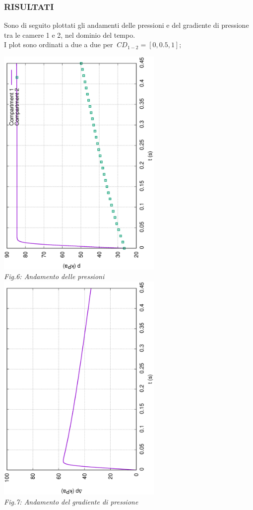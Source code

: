 \documentclass{article}
\begin{document}
        \subsubsection{RISULTATI}
        Sono di seguito plottati gli andamenti delle pressioni e del 
        gradiente di pressione tra le camere 1 e 2, nel dominio del tempo. \\ 
        I plot sono ordinati a due a due per $\ CD_{1-2} = [0, 0.5, 1];$ \

        \begin{center}
            \includegraphics[width=0.6\textwidth, angle=-90]{MUL2/p_ES1_0.eps}\\ 
            \textit{Fig.6: Andamento delle pressioni} \\ 
            \includegraphics[width=0.6\textwidth, angle=-90]{MUL2/Dp_ES1_0.eps}\\ 
            \textit{Fig.7: Andamento del gradiente di pressione}\\
        \end{center}
        \pagebreak
        
\end{document}
